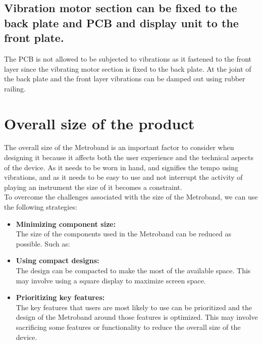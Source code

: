 \documentclass{article}
\begin{document}
        \subsection{Vibration motor section can be fixed to the back plate and PCB and display unit to the front plate.} 
 
        The PCB is not allowed to be subjected to vibrations as it fastened to the front layer since the vibrating motor section is fixed to the back plate. At the joint of the back plate and the front layer vibrations can be damped out using rubber railing.


        \section{Overall size of the product}
        The overall size of the Metroband is an important factor to consider when designing it because it affects both the user experience and the technical aspects of the device. As it needs to be worn in hand, and signifies the tempo using vibrations, and as it needs to be easy to use and not interrupt the activity of playing an instrument the size of it becomes a constraint.\\
        
        To overcome the challenges associated with the size of the Metroband, we can use the following strategies:

        \begin{itemize}
            \item \textbf{Minimizing component size:}\\
            The size of the components used in the Metroband can be reduced as possible. Such as:


            \item \textbf{Using compact designs:}\\
            The design can be compacted to make the most of the available space. This may involve using a square display to maximize screen space.

            \item \textbf{Prioritizing key features:}\\
            The key features that users are most likely to use can be prioritized and the design of the Metroband around those features is optimized. This may involve sacrificing some features or functionality to reduce the overall size of the device.
        \end{itemize}
\end{document}
